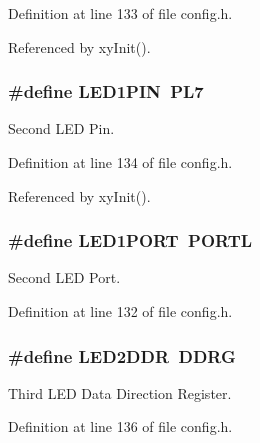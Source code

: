 Definition at line 133 of file config.\-h.



Referenced by xy\-Init().

\hypertarget{group__config_ga04d7aaffbb7b5afaf49acf8a3a39e33a}{
\subsubsection[{L\-E\-D1\-P\-I\-N}]{\setlength{\rightskip}{0pt plus 5cm}\#define L\-E\-D1\-P\-I\-N~P\-L7}}\label{group__config_ga04d7aaffbb7b5afaf49acf8a3a39e33a}


Second L\-E\-D Pin. 



Definition at line 134 of file config.\-h.



Referenced by xy\-Init().

\hypertarget{group__config_ga3931891a757b08dbdfeaa8afd4dcb664}{
\subsubsection[{L\-E\-D1\-P\-O\-R\-T}]{\setlength{\rightskip}{0pt plus 5cm}\#define L\-E\-D1\-P\-O\-R\-T~P\-O\-R\-T\-L}}\label{group__config_ga3931891a757b08dbdfeaa8afd4dcb664}


Second L\-E\-D Port. 



Definition at line 132 of file config.\-h.

\hypertarget{group__config_ga7e635626ee31b094da0a668476132577}{
\subsubsection[{L\-E\-D2\-D\-D\-R}]{\setlength{\rightskip}{0pt plus 5cm}\#define L\-E\-D2\-D\-D\-R~D\-D\-R\-G}}\label{group__config_ga7e635626ee31b094da0a668476132577}


Third L\-E\-D Data Direction Register. 



Definition at line 136 of file config.\-h.



